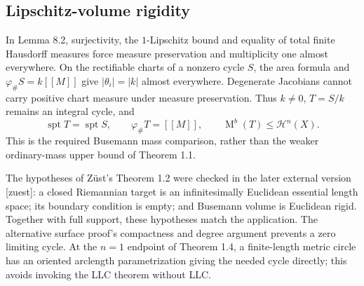 \documentclass[10pt]{article}
\begin{document}
\subsection*{Lipschitz-volume rigidity}
In Lemma 8.2, surjectivity, the \(1\)-Lipschitz bound and equality of total finite Hausdorff measures force measure preservation and multiplicity one almost everywhere. On the rectifiable charts of a nonzero cycle \(S\), the area formula and \(\varphi_\#S=k[\![M]\!]\) give \(|\theta_i|=|k|\) almost everywhere. Degenerate Jacobians cannot carry positive chart measure under measure preservation. Thus \(k\ne0\), \(T=S/k\) remains an integral cycle, and \[\operatorname{spt}T=\operatorname{spt}S,\qquad \varphi_\#T=[\![M]\!],\qquad
 \operatorname{M}^{b}(T)\le\mathcal H^n(X).\] This is the required Busemann mass comparison, rather than the weaker ordinary-mass upper bound of Theorem 1.1.\par
The hypotheses of Züst’s Theorem 1.2 were checked in the later external version [zuest]: a closed Riemannian target is an infinitesimally Euclidean essential length space; its boundary condition is empty; and Busemann volume is Euclidean rigid. Together with full support, these hypotheses match the application. The alternative surface proof’s compactness and degree argument prevents a zero limiting cycle. At the \(n=1\) endpoint of Theorem 1.4, a finite-length metric circle has an oriented arclength parametrization giving the needed cycle directly; this avoids invoking the LLC theorem without LLC.\par
\end{document}

